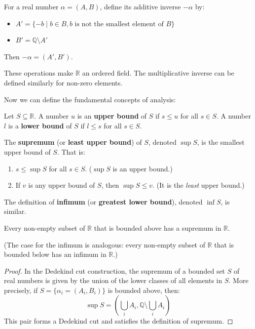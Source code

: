 \documentclass[oneside]{book}
\begin{document}
\begin{definition}
For a real number $\alpha = (A, B)$, define its additive inverse $-\alpha$ by:
\begin{itemize}
    \item $A' = \{-b \mid b \in B, b \text{ is not the smallest element of } B\}$
    \item $B' = \mathbb{Q} \setminus A'$
\end{itemize}
Then $-\alpha = (A', B')$.
\end{definition}

These operations make $\mathbb{R}$ an ordered field. The multiplicative inverse can be defined similarly for non-zero elements.

Now we can define the fundamental concepts of analysis:

\begin{definition}
Let $S \subseteq \mathbb{R}$. A number $u$ is an \textbf{upper bound} of $S$ if $s \le u$ for all $s \in S$. A number $l$ is a \textbf{lower bound} of $S$ if $l \le s$ for all $s \in S$.
\end{definition}

\begin{definition}[Supremum]
The \textbf{supremum} (or \textbf{least upper bound}) of $S$, denoted $\sup S$, is the smallest upper bound of $S$. That is:
\begin{enumerate}
    \item $s \le \sup S$ for all $s \in S$. ($\sup S$ is an upper bound.)
    \item If $v$ is any upper bound of $S$, then $\sup S \le v$. (It is the \emph{least} upper bound.)
\end{enumerate}
The definition of \textbf{infimum} (or \textbf{greatest lower bound}), denoted $\inf S$, is similar.
\end{definition}

\begin{theorem}
Every non-empty subset of $\mathbb{R}$ that is bounded above has a supremum in $\mathbb{R}$.
\end{theorem}
(The case for the infimum is analogous: every non-empty subset of $\mathbb{R}$ that is bounded below has an infimum in $\mathbb{R}$.)

\begin{proof}
In the Dedekind cut construction, the supremum of a bounded set $S$ of real numbers is given by the union of the lower classes of all elements in $S$. More precisely, if $S = \{\alpha_i = (A_i, B_i)\}$ is bounded above, then:
\[
\sup S = \left(\bigcup_i A_i, \mathbb{Q} \setminus \bigcup_i A_i\right)
\]
This pair forms a Dedekind cut and satisfies the definition of supremum.
\end{proof}
\end{document}
